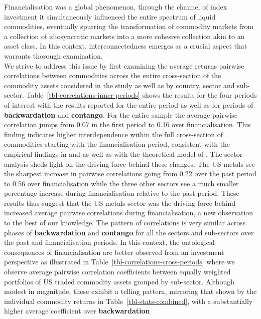 \documentclass[
  authoryear,
  preprint,
  3p]{elsarticle}
\begin{document}
\medskip

Financialisation was a global phenomenon, through the channel of index
investment it simultaneously influenced the entire spectrum of liquid
commodities, eventually spurring the transformation of commodity markets
from a collection of idiosyncratic markets into a more cohesive
collection akin to an asset class. In this context, interconnectedness
emerges as a crucial aspect that warrants thorough examination.\\
We strive to address this issue by first examining the average returns
pairwise correlations between commodities across the entire
cross-section of the commodity assets considered in the study as well as
by country, sector and sub-sector.
Table~\ref{tbl-correlations-inner-periods} shows the results for the
four periods of interest with the results reported for the entire period
as well as for periods of \textbf{backwardation} and \textbf{contango}.
For the entire sample the average pairwise correlation jumps from 0.07
in the first period to 0.16 over financialisation. This finding
indicates higher interdependence within the full cross-section of
commodities starting with the financialisation period, consistent with
the empirical findings in \citet{fryMcKibbin_evolution_2023} and
\citet{mayer_financialization_2017} as well as with the theoretical
model of \citet{basak_model_2016}. The sector analysis sheds light on
the driving force behind these changes. The US metals see the sharpest
increase in pairwise correlations going from 0.22 over the past period
to 0.56 over financialisation while the three other sectors see a much
smaller percentage increase during financialisation relative to the past
period. These results thus suggest that the US metals sector was the
driving force behind increased average pairwise correlations during
financialisation, a new observation to the best of our knowledge. The
pattern of correlations is very similar across phases of
\textbf{backwardation} and \textbf{contango} for all the sectors and
sub-sectors over the past and financialisation periods. In this context,
the ontological consequences of financialisation are better observed
from an investment perspective as illustrated in
Table~\ref{tbl-correlations-cross-periods} where we observe average
pairwise correlation coefficients between equally weighted portfolios of
US traded commodity assets grouped by sub-sector. Although modest in
magnitude, these exhibit a telling pattern, mirroring that shown by the
individual commodity returns in Table~\ref{tbl-stats-combined}, with a
substantially higher average coefficient over \textbf{backwardation}
\end{document}

